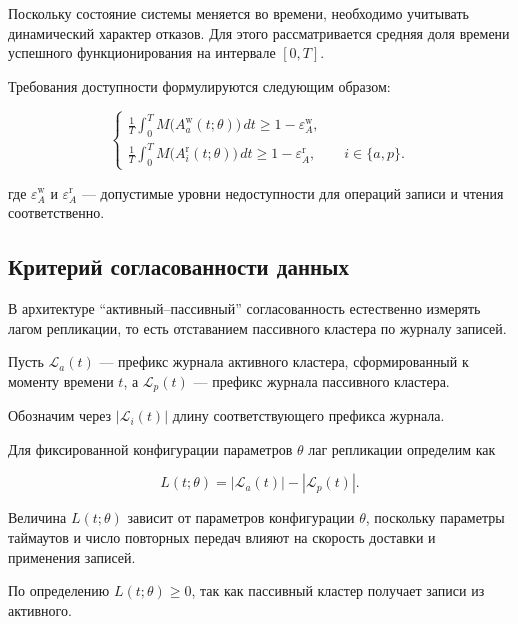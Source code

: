 Поскольку состояние системы меняется во времени,
необходимо учитывать динамический характер отказов.
Для этого рассматривается средняя доля времени
успешного функционирования на интервале $[0,T]$.

Требования доступности формулируются следующим образом:

\begin{equation}
\begin{cases}
\displaystyle
\frac{1}{T}
\int_{0}^{T}
M\big(A_a^{\mathrm{w}}(t;\theta)\big)\, dt
\ge
1 - \varepsilon_A^{\mathrm{w}}, \\[1.2em]

\displaystyle
\frac{1}{T}
\int_{0}^{T}
M\big(A_i^{\mathrm{r}}(t;\theta)\big)\, dt
\ge
1 - \varepsilon_A^{\mathrm{r}},
\qquad
i \in \{a,p\}.
\end{cases}
\label{eq:availability_system}
\end{equation}

где
$\varepsilon_A^{\mathrm{w}}$ и
$\varepsilon_A^{\mathrm{r}}$
— допустимые уровни недоступности
для операций записи и чтения соответственно.

\subsection{Критерий согласованности данных}

В архитектуре ``активный--пассивный''
согласованность естественно измерять лагом репликации,
то есть отставанием пассивного кластера по журналу записей.

Пусть $\mathcal{L}_a(t)$ — префикс журнала активного кластера,
сформированный к моменту времени $t$,
а $\mathcal{L}_p(t)$ — префикс журнала пассивного кластера.

Обозначим через $|\mathcal{L}_i(t)|$
длину соответствующего префикса журнала.

Для фиксированной конфигурации параметров $\theta$
лаг репликации определим как

\begin{equation}
L(t;\theta)
=
|\mathcal{L}_a(t)|
-
|\mathcal{L}_p(t)|.
\label{eq:log_lag}
\end{equation}

Величина $L(t;\theta)$ зависит от параметров конфигурации $\theta$,
поскольку параметры таймаутов и число повторных передач
влияют на скорость доставки и применения записей.

По определению $L(t;\theta)\ge0$,
так как пассивный кластер получает записи из активного.


